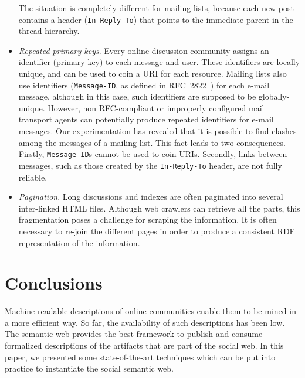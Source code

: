 \documentclass{../templates/www2008-submission}
\begin{document}
\begin{itemize}
        The situation is completely different for mailing lists, because
        each new post contains a header (\texttt{In-Reply-To}) that points
        to the immediate parent in the thread hierarchy.

  \item \emph{Repeated primary keys}. Every online discussion community assigns
        an identifier (primary key) to each message and user. These
        identifiers are locally unique, and can be used to coin a URI
        for each resource. Mailing lists also use identifiers
        (\texttt{Message-ID}, as defined in RFC~2822~\cite{RFC2822}) for
        each e-mail message, although in this case, such identifiers are
        supposed to be globally-unique. However, non RFC-compliant or
        improperly configured mail transport agents can potentially produce repeated
        identifiers for e-mail messages. Our experimentation has
        revealed that it is possible to find clashes among the messages
        of a mailing list. This fact leads to two consequences. Firstly,
        \texttt{Message-ID}s cannot be used to coin URIs. Secondly,
        links between messages, such as those created by the
        \texttt{In-Reply-To} header, are not fully reliable.

  \item \emph{Pagination}. Long discussions and indexes are often paginated
        into several inter-linked HTML files. Although web crawlers can
        retrieve all the parts, this fragmentation poses a challenge for
        scraping the information. It is often necessary to re-join the
        different pages in order to produce a consistent RDF representation
        of the information.

\end{itemize}


\section{\label{sec:conclusions}Conclusions}

Machine-readable descriptions of online communities enable them
to be mined in a more efficient way. So far, the availability of
such descriptions has been low. The semantic web provides the
best framework to publish and consume formalized descriptions of
the artifacts that are part of the social web. In this paper,
we presented some state-of-the-art techniques which can be
put into practice to instantiate the social semantic web.
\end{document}
